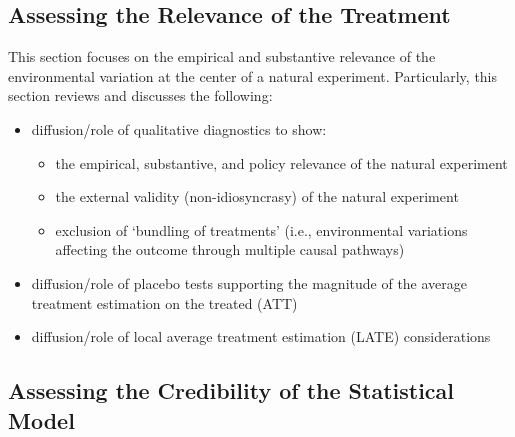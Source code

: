 \documentclass[nobib]{tufte-handout}
\begin{document}
\begin{refsection}
\subsection{Assessing the Relevance of the Treatment}
\label{sub:relevance}

\noindent This section focuses on the empirical and substantive relevance of the
environmental variation at the center of a natural experiment.  Particularly,
this section reviews and discusses the following:

\begin{itemize}
    \item diffusion/role of qualitative diagnostics to show:
        \begin{itemize}
            \item the empirical, substantive, and policy relevance of the
                natural experiment
            \item the external validity (non-idiosyncrasy) of the natural
                experiment
            \item exclusion of `bundling of treatments' (i.e., environmental
                variations affecting the outcome through multiple causal
                pathways)
        \end{itemize}
    \item diffusion/role of placebo tests supporting the magnitude of the
        average treatment estimation on the treated  (ATT)
    \item diffusion/role of local average treatment estimation (LATE) 
        considerations
\end{itemize}

%
%
%
%
%
%
%
%
%
%
%

\subsection{Assessing the Credibility of the Statistical Model}
\label{sub:credibility}


\end{refsection}
\end{document}

